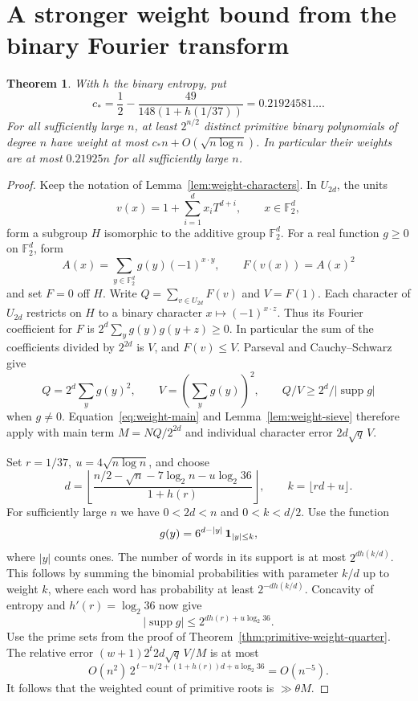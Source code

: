 \documentclass[11pt]{article}
\newtheorem{theorem}{Theorem}
\newcommand{\F}{\mathbb F_2}
\begin{document}
\section{A stronger weight bound from the binary Fourier transform}\label{sec:fourier-weight}
\begin{theorem}\label{thm:fourier-weight}
With \(h\) the binary entropy, put
\[
 c_*=\frac12-\frac{49}{148(1+h(1/37))}=0.21924581\ldots .
\]
For all sufficiently large \(n\), at least \(2^{n/2}\) distinct primitive
binary polynomials of degree \(n\) have weight at most
\(c_*n+O(\sqrt{n\log n})\). In particular their weights are at most
\(0.21925n\) for all sufficiently large \(n\).
\end{theorem}
\begin{proof}
Keep the notation of Lemma~\ref{lem:weight-characters}. In \(U_{2d}\),
the units
\[
 v(x)=1+\sum_{i=1}^d x_iT^{d+i},\qquad x\in\F^d,
\]
form a subgroup \(H\) isomorphic to the additive group \(\F^d\).
For a real function \(g\ge0\) on \(\F^d\), form
\[
 A(x)=\sum_{y\in\F^d}g(y)(-1)^{x\cdot y},\qquad F(v(x))=A(x)^2
\]
and set \(F=0\) off \(H\). Write \(Q=\sum_{v\in U_{2d}}F(v)\) and
\(V=F(1)\). Each character of \(U_{2d}\) restricts on \(H\) to a
binary character \(x\mapsto(-1)^{x\cdot z}\). Thus its Fourier
coefficient for \(F\) is \(2^d\sum_y g(y)g(y+z)\ge0\).
In particular the sum of the coefficients divided by \(2^{2d}\) is
\(V\), and \(F(v)\le V\). Parseval and Cauchy--Schwarz give
\[
 Q=2^d\sum_y g(y)^2,\qquad
 V=\left(\sum_y g(y)\right)^2,\qquad
 Q/V\ge 2^d/|\operatorname{supp}g|
\]
when \(g\ne0\). Equation~\eqref{eq:weight-main} and
Lemma~\ref{lem:weight-sieve} therefore apply with main term
\(M=NQ/2^{2d}\) and individual character error \(2d\sqrt q\,V\).

Set \(r=1/37,\ u=4\sqrt{n\log n}\), and choose
\[
 d=\left\lfloor
 \frac{n/2-\sqrt n-7\log_2 n-u\log_2 36}{1+h(r)}
 \right\rfloor,\qquad k=\lfloor rd+u\rfloor .
\]
For sufficiently large \(n\) we have \(0<2d<n\) and \(0<k<d/2\).
Use the function
\[
 g(y)=6^{d-|y|}\,{\bf1}_{|y|\le k},
\]
where \(|y|\) counts ones. The number of words in its support is at
most \(2^{dh(k/d)}\). This follows by summing the binomial
probabilities with parameter \(k/d\) up to weight \(k\), where each
word has probability at least \(2^{-dh(k/d)}\).
Concavity of entropy and \(h'(r)=\log_2 36\) now give
\[
 |\operatorname{supp}g|\le 2^{dh(r)+u\log_2 36}.
\]
Use the prime sets from the proof of Theorem~\ref{thm:primitive-weight-quarter}.
The relative error \((w+1)2^t2d\sqrt q\,V/M\) is at most
\[
 O(n^2)\,2^{\,t-n/2+(1+h(r))d+u\log_2 36}=O(n^{-5}).
\]
It follows that the weighted count of primitive roots is
\(\gg\theta M\).


\end{proof}
\end{document}
